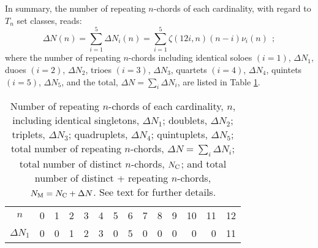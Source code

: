 \documentclass[12pt,a4paper]{article}
\begin{document}
In summary, the number of repeating $n$-chords of each cardinality, with
regard to $T_n$ set classes, reads:
\begin{equation}
\label{eq:DeN}
\Delta N(n)=\sum_{i=1}^5\Delta N_i(n)=\sum_{i=1}^5\zeta(12i,n)(n-i)\nu_i(n)~~;
\end{equation}
where the number of repeating $n$-chords including identical soloes $(i=1)$,
$\Delta N_1$, duoes $(i=2)$, $\Delta N_2$, trioes $(i=3)$, $\Delta N_3$,
quartets $(i=4)$, $\Delta N_4$, quintets $(i=5)$, $\Delta N_5$, and the
total, $\Delta N=\sum_i\Delta N_i$, are listed in Table \ref{t:repN}.
%
\begin{table}
\caption{Number of repeating $n$-chords of each cardinality, $n$, including
identical singletons, $\Delta N_1$; doublets, $\Delta N_2$; triplets,
$\Delta N_3$; quadruplets, $\Delta N_4$; quintuplets, $\Delta N_5$; total
number of repeating $n$-chords, $\Delta N=\sum_i\Delta N_i$; total number of 
distinct $n$-chords, $N_{\rm C}$; and total number of distinct + repeating
$n$-chords,
$N_{\rm M}=N_{\rm C}+\Delta N$.   See text for further details.}
\label{t:repN}
\begin{center}
\begin{tabular}{|c|r|r|r|r|r|r|r|r|r|r|r|r|r|} \hline
\hline
$n$                        & \phantom{$$}0          & 1 &  2                  &  3                  &   4                  &   5 &   6 &   7 &   8                  &   9                 & 10                  & 11 & 12                     \\
$\Delta N_1$               & \phantom{$$}0          & 0 &  1                  &  2                  &   3                  &   0 &   5 &   0 &   0                  &   0                 &  0                  &  0 & 11                     \\

\end{tabular}
\end{center}
\end{table}
\end{document}
